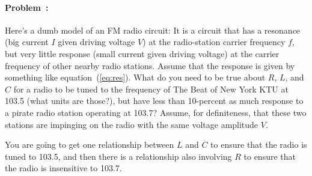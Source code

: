 \documentclass[12pt]{article}
\begin{document}
\paragraph{Problem~\theproblem:}%
Here's a dumb model of an FM radio circuit: It is a circuit that has a
resonance (big current $I$ given driving voltage $V$) at the radio-station
carrier frequency $f$, but very little response (small current given
driving voltage) at the carrier frequency of other nearby radio stations.
Assume that the response is given by something like
equation~(\ref{eq:res}). What do you need to be true about $R$, $L$,
and $C$ for a radio to be tuned to the frequency of The Beat of New
York KTU at 103.5 (what units are those?),
but have less than 10-percent as much
response to a pirate radio station operating at 103.7? Assume, for
definiteness, that these two stations are impinging on the radio with
the same voltage amplitude $V$.

You are going to get one relationship between $L$ and
$C$ to ensure that the radio is tuned to 103.5, and then there is a
relationship also involving $R$ to ensure that the radio is
insensitive to 103.7.
\end{document}
